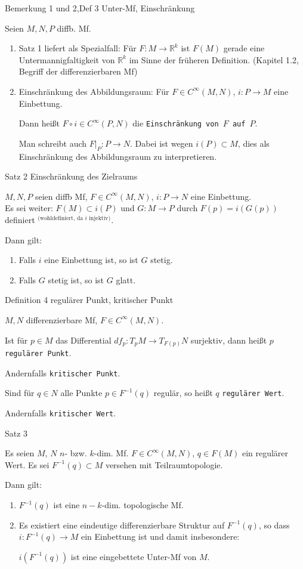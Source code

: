 \documentclass[a6paper,11pt,grid=front]{kartei}
\newcommand{\fl}[1]{\begin{flushleft}
 #1 \end{flushleft}}
\newcommand{\R}{\mathbb{R}}
\newcounter{def}
\begin{document}
\nonameyet
{Bemerkung 1 und 2,Def 3} {Unter-Mf, Einschränkung}
{
\small
	Seien $M,N,P$ diffb. Mf.
\begin{enumerate}[1.]
\item Satz 1 liefert als Spezialfall: Für $F : M \to \R^k$ ist $F(M)$ 
gerade eine Untermannigfaltigkeit von $\R^k$ im Sinne der früheren Definition.
(Kapitel 1.2, Begriff der differenzierbaren Mf) 

\item Einschränkung des Abbildungsraum: Für $F\in C^\infty(M,N)$, $i : P \to M$
eine Einbettung. 
\par
Dann heißt $F\circ i \in C^\infty(P,N)$ die \texttt{Einschränkung von $F$
auf $P$}.
\par Man schreibt auch $F|_P : P \to N$. Dabei ist wegen $i(P) \subset M$, dies
als Einschränkung des Abbildungsraum zu interpretieren.
\end{enumerate}
}
{}

\nonameyet
{Satz 2} {Einschränkung des Zielraums}
{
$M,N,P$ seien diffb Mf, $F\in C^\infty(M,N)$, $i : P \to N$ eine Einbettung.
\\
Es sei weiter: $F(M) \subset i(P)$ 
und $G : M \to P$ durch $F(p) = i(G(p))$ definiert
$^{\text{(wohldefiniert, da $i$ injektiv)}}$.
\fl{Dann gilt:}
\begin{enumerate}[1.]
\item Falls $i$ eine Einbettung ist, so ist $G$ stetig. 
\item Falls $G$ stetig ist, so ist $G$ glatt.
\end{enumerate}
}
{}

\nonameyet
{Definition 4} {regulärer Punkt, kritischer Punkt}
{
$M,N$ differenzierbare Mf, $F\in C^\infty(M,N)$.

\fl{Ist für $p\in M$ das Differential $df_p : T_pM \to T_{F(p)}N$ surjektiv,
dann heißt $p$ \texttt{regulärer Punkt}.\par
Andernfalls \texttt{kritischer Punkt}.}
\fl{
Sind für $q\in N$ alle Punkte $p \in F^ {-1}(q)$ regulär, so heißt $q$ 
\texttt{regulärer Wert}.	
\par
Andernfalls \texttt{kritischer Wert}.}
}
{}

\nonameyet
{Satz 3} {}
{
\small
Es seien $M$, $N$ $n$- bzw. $k$-dim. Mf. $F\in C^\infty(M,N)$, $q\in F(M)$ ein
regulärer Wert. Es sei $F^ {-1}(q)\subset M$ versehen mit Teilraumtopologie.
\fl{Dann gilt:}
\begin{enumerate}[1.]
\item $F^ {-1}(q)$ ist eine $n-k$-dim. topologische Mf. 
\item Es existiert eine eindeutige differenzierbare Struktur auf $F^ {-1}(q)$, 
so dass $i : F^ {-1}(q) \to M$ ein Einbettung ist und damit insbesondere:
\par $i(F^ {-1}(q))$ ist eine eingebettete Unter-Mf von $M$.
\end{enumerate}
}
{}
\end{document}
